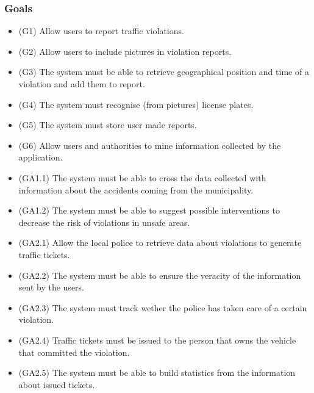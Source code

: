 \subsubsection{Goals}
\begin{itemize}
	\item (G1) 	Allow users to report traffic violations. \newline	
	\item (G2)	Allow users to include pictures in violation reports. \newline
	\item (G3)	The system must be able to retrieve geographical position and time of a violation and add them to report.\newline
	\item (G4)	The system must recognise (from pictures) license plates.\newline
	\item (G5) 	The system must store user made reports.\newline
	\item (G6)	Allow users and authorities to mine information collected by the application. \newline
	\item (GA1.1)	The system must be able to cross the data collected with information about the accidents coming from the municipality. \newline
	\item (GA1.2)	The system must be able to suggest possible interventions to decrease the risk of violations in unsafe areas. \newline
	\item (GA2.1)	Allow the local police to retrieve data about violations to generate traffic tickets. \newline
	\item (GA2.2)	The system must be able to ensure the veracity of the information sent by the users. \newline
	\item (GA2.3)	The system must track wether the police has taken care of a certain violation. \newline
	\item (GA2.4)	Traffic tickets must be issued to the person that owns the vehicle that committed the violation. \newline
	\item (GA2.5)	The system must be able to build statistics from the information about issued tickets. 
\end{itemize}

